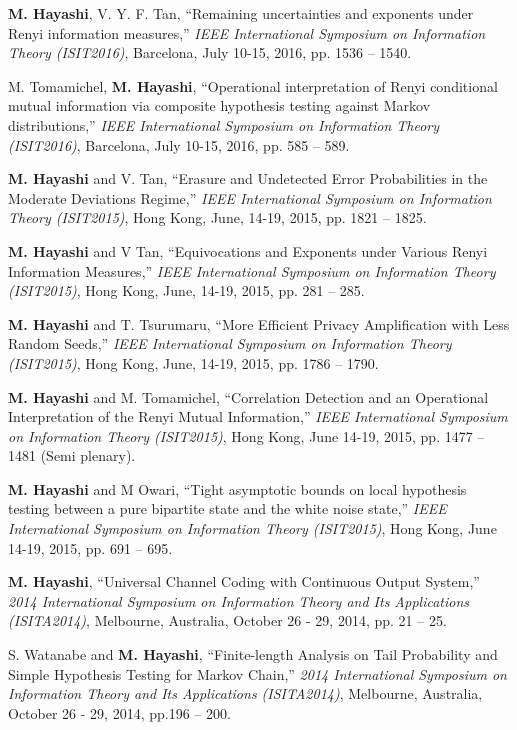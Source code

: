 \documentclass[a4paper,12pt,oneside]{article}
\begin{document}
\begin{enumerate}
\textbf{M. Hayashi}, V. Y. F. Tan, ``Remaining uncertainties and exponents under Renyi information measures,'' 
{\em IEEE International Symposium on Information Theory (ISIT2016)}, 
Barcelona, July 10-15, 2016, pp. 1536 -- 1540.

M. Tomamichel, \textbf{M. Hayashi}, ``Operational interpretation of Renyi conditional mutual information via composite hypothesis testing against Markov distributions,'' 
{\em IEEE International Symposium on Information Theory (ISIT2016)}, 
Barcelona, July 10-15, 2016, pp. 585 -- 589.

\textbf{M. Hayashi} and V. Tan, 
``Erasure and Undetected Error Probabilities in the Moderate Deviations Regime,'' 
{\em IEEE International Symposium on Information Theory (ISIT2015)},
Hong Kong, June, 14-19, 2015, pp. 1821 -- 1825.

\textbf{M. Hayashi} and V Tan, 
``Equivocations and Exponents under Various Renyi Information Measures,'' 
{\em IEEE International Symposium on Information Theory (ISIT2015)},
Hong Kong, June, 14-19, 2015, pp. 281 -- 285.

\textbf{M. Hayashi} and T. Tsurumaru, 
``More Efficient Privacy Amplification with Less Random Seeds,'' 
{\em IEEE International Symposium on Information Theory (ISIT2015)},
Hong Kong, June, 14-19, 2015, pp. 1786 -- 1790.

\textbf{M. Hayashi} and M. Tomamichel, 
``Correlation Detection and an Operational Interpretation of the Renyi Mutual Information,'' 
{\em IEEE International Symposium on Information Theory (ISIT2015)},
Hong Kong, June 14-19, 2015, pp. 1477 -- 1481 (Semi plenary).

\textbf{M. Hayashi} and M Owari, 
``Tight asymptotic bounds on local hypothesis testing between a pure bipartite state and the white noise state,'' 
{\em IEEE International Symposium on Information Theory (ISIT2015)},
Hong Kong, June 14-19, 2015, pp. 691 -- 695.

\textbf{M. Hayashi},
``Universal Channel Coding with Continuous Output System,'' 
{\em 2014 International Symposium on Information Theory and Its Applications (ISITA2014)}, Melbourne, Australia, October 26 - 29, 2014, pp. 21 -- 25.

S. Watanabe and \textbf{M. Hayashi},
``Finite-length Analysis on Tail Probability and Simple Hypothesis Testing for Markov Chain,'' 
{\em 2014 International Symposium on Information Theory and Its Applications (ISITA2014)}, Melbourne, Australia, October 26 - 29, 2014, pp.196 -- 200.


\end{enumerate}
\end{document}

